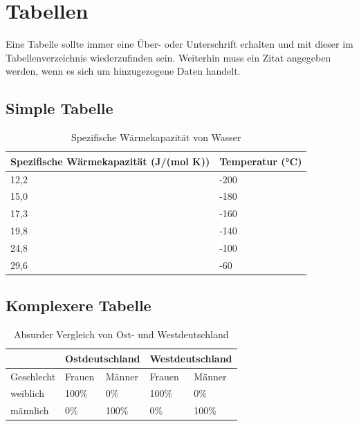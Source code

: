 \newpage

\section{Tabellen}

Eine Tabelle sollte immer eine Über- oder Unterschrift erhalten und mit dieser im Tabellenverzeichnis wiederzufinden sein. Weiterhin muss ein Zitat angegeben werden, wenn es sich um hinzugezogene Daten handelt.

\subsection{Simple Tabelle}

\begin{table}[H]
\centering
\begin{tabular}{|l|l|} 
\hline
Spezifische Wärmekapazität (J/(mol K)) & Temperatur (°C)  \\ 
\hline
12,2                                   & -200             \\ 
\hline
15,0                                   & -180             \\ 
\hline
17,3                                   & -160             \\ 
\hline
19,8                                   & -140             \\ 
\hline
24,8                                   & -100             \\ 
\hline
29,6                                   & -60              \\
\hline
\end{tabular}
\caption{Spezifische Wärmekapazität von Wasser \cite{TestCitation020}}
\end{table}

\subsection{Komplexere Tabelle}

\newcommand{\tabtitel}[1]{\multicolumn{2}{l|}{\textbf{#1}}}

\begin{table}[H]
\centering
\begin{tabular}{|l|l|l|l|l|} 
\hline
           & \tabtitel{Ostdeutschland} & \tabtitel{Westdeutschland}  \\ 
\hline
Geschlecht & Frauen & Männer           & Frauen & Männer                       \\ 
\hline
weiblich   & 100\%  & 0\%              & 100\%  & 0\%                          \\ 
\hline
männlich   & 0\%    & 100\%            & 0\%    & 100\%                        \\
\hline
\end{tabular}
\caption{Absurder Vergleich von Ost- und Westdeutschland}
\end{table}

